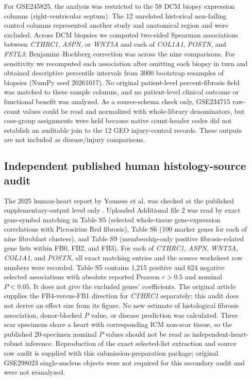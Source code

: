 \documentclass[preprint,11pt]{elsarticle}
\newcommand{\cthrc}{\textit{CTHRC1}}
\begin{document}
For GSE245825, the analysis was restricted to the 58 DCM biopsy expression columns (right-ventricular septum). The 12 unrelated historical non-failing control columns represented another study and anatomical region and were excluded. Across DCM biopsies we computed two-sided Spearman associations between \cthrc{}, \textit{ASPN}, or \textit{WNT5A} and each of \textit{COL1A1}, \textit{POSTN}, and \textit{FSTL3}; Benjamini--Hochberg correction was across the nine comparisons. For sensitivity we recomputed each association after omitting each biopsy in turn and obtained descriptive percentile intervals from 3000 bootstrap resamples of biopsies (NumPy seed 20261017). No original patient-level percent-fibrosis field was matched to these sample columns, and no patient-level clinical outcome or functional benefit was analyzed. As a source-schema check only, GSE234715 raw-count values could be read and normalized with whole-library denominators, but case-group assignments were held because native count-header codes did not establish an auditable join to the 12 GEO injury-control records. These outputs are not included as disease/injury comparisons.

\subsection{Independent published human histology-source audit}
The 2025 human-heart report by Youness et al. was checked at the published supplementary-output level only \cite{Youness2025}. Uploaded Additional file 2 was read by exact gene-symbol matching in Table S5 (selected whole-tissue gene-expression correlations with Picrosirius Red fibrosis), Table S6 (100 marker genes for each of nine fibroblast clusters), and Table S9 (membership-only positive fibrosis-related gene lists within FB0, FB2, and FB3). For each of \textit{CTHRC1}, \textit{ASPN}, \textit{WNT5A}, \textit{COL1A1}, and \textit{POSTN}, all exact matching entries and the source worksheet row numbers were recorded. Table S5 contains 1,215 positive and 624 negative selected associations with absolute reported Pearson $r>0.5$ and nominal $P<0.05$. It does not give the excluded genes' coefficients. The original article supplies the FB4-versus-FB1 direction for \cthrc{} separately; this audit does not derive an effect size from its figure. No new estimate of histological fibrosis association, donor-blocked $P$ value, or disease prediction was calculated. Three scar specimens share a heart with corresponding ICM non-scar tissue, so the published 20-specimen nominal $P$ values should not be read as independent-heart-robust inference. Reproduction of the exact selected-list extraction and source row audit is supplied with this submission-preparation package; original GSE298023 single-nucleus objects were not required for this secondary audit and were not reanalyzed.
\end{document}
